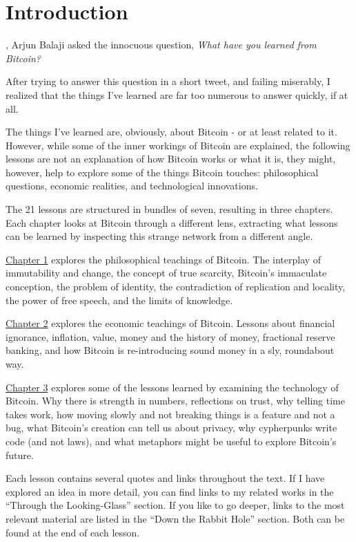 \chapter{Introduction}
\label{ch:introduction}

, Arjun Balaji asked the innocuous question,
\textit{What have you learned from Bitcoin?}

After trying to answer this question in a short tweet, and failing miserably, I
realized that the things I've learned are far too numerous to answer quickly, if
at all.

The things I've learned are, obviously, about Bitcoin - or at least related to
it. However, while some of the inner workings of Bitcoin are explained, the
following lessons are not an explanation of how Bitcoin works or what it is,
they might, however, help to explore some of the things Bitcoin touches:
philosophical questions, economic realities, and technological innovations.

The 21 lessons are structured in bundles of seven, resulting in three chapters.
Each chapter looks at Bitcoin through a different lens, extracting what
lessons can be learned by inspecting this strange network from a different
angle.

\hyperref[ch:philosophy]{Chapter 1} explores the philosophical teachings of
Bitcoin. The interplay of immutability and change, the concept of true scarcity,
Bitcoin's immaculate conception, the problem of identity, the contradiction of
replication and locality, the power of free speech, and the limits of knowledge.

\hyperref[ch:economics]{Chapter 2} explores the economic teachings of Bitcoin.
Lessons about financial ignorance, inflation, value, money and the history of
money, fractional reserve banking, and how Bitcoin is re-introducing sound money
in a sly, roundabout way.

\hyperref[ch:technology]{Chapter 3} explores some of the lessons learned by
examining the technology of Bitcoin.  Why there is strength in numbers,
reflections on trust, why telling time takes work, how moving slowly and not
breaking things is a feature and not a bug, what Bitcoin's creation can tell us
about privacy, why cypherpunks write code (and not laws), and what metaphors
might be useful to explore Bitcoin's future.

Each lesson contains several quotes and links throughout the text. If I have
explored an idea in more detail, you can find links to my related works in the
``Through the Looking-Glass'' section. If you like to go deeper, links to the most
relevant material are listed in the ``Down the Rabbit Hole'' section. Both can be
found at the end of each lesson.

